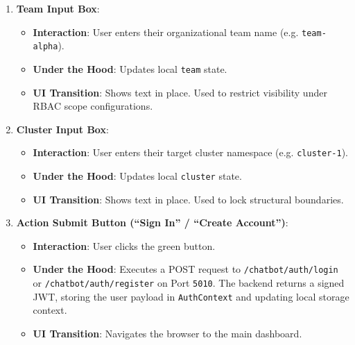 \documentclass[11pt,a4paper]{article}
\begin{document}
\begin{enumerate}
    \item \textbf{Team Input Box}:
    \begin{itemize}
        \item \textbf{Interaction}: User enters their organizational team name (e.g. \texttt{team-alpha}).
        \item \textbf{Under the Hood}: Updates local \texttt{team} state.
        \item \textbf{UI Transition}: Shows text in place. Used to restrict visibility under RBAC scope configurations.
    \end{itemize}
    
    \item \textbf{Cluster Input Box}:
    \begin{itemize}
        \item \textbf{Interaction}: User enters their target cluster namespace (e.g. \texttt{cluster-1}).
        \item \textbf{Under the Hood}: Updates local \texttt{cluster} state.
        \item \textbf{UI Transition}: Shows text in place. Used to lock structural boundaries.
    \end{itemize}
    
    \item \textbf{Action Submit Button (``Sign In'' / ``Create Account'')}:
    \begin{itemize}
        \item \textbf{Interaction}: User clicks the green button.
        \item \textbf{Under the Hood}: Executes a POST request to \texttt{/chatbot/auth/login} or \texttt{/chatbot/auth/register} on Port \texttt{5010}. The backend returns a signed JWT, storing the user payload in \texttt{AuthContext} and updating local storage context.
        \item \textbf{UI Transition}: Navigates the browser to the main dashboard.
    \end{itemize}
\end{enumerate}
\end{document}
